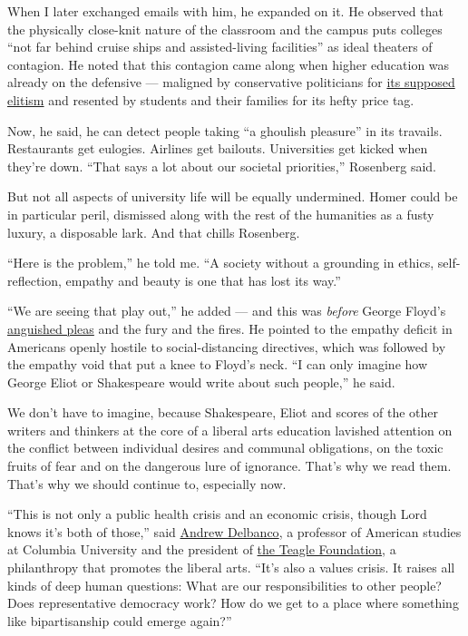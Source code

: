 When I later exchanged emails with him, he expanded on it. He observed
that the physically close-knit nature of the classroom and the campus
puts colleges ``not far behind cruise ships and assisted-living
facilities'' as ideal theaters of contagion. He noted that this
contagion came along when higher education was already on the defensive
--- maligned by conservative politicians for
\href{https://www.washingtonpost.com/sf/national/2017/11/25/elitists-crybabies-and-junky-degrees/?utm_term=.032f27b188bc}{its
supposed elitism} and resented by students and their families for its
hefty price tag.

Now, he said, he can detect people taking ``a ghoulish pleasure'' in its
travails. Restaurants get eulogies. Airlines get bailouts. Universities
get kicked when they're down. ``That says a lot about our societal
priorities,'' Rosenberg said.

But not all aspects of university life will be equally undermined. Homer
could be in particular peril, dismissed along with the rest of the
humanities as a fusty luxury, a disposable lark. And that chills
Rosenberg.

``Here is the problem,'' he told me. ``A society without a grounding in
ethics, self-reflection, empathy and beauty is one that has lost its
way.''

``We are seeing that play out,'' he added --- and this was \emph{before}
George Floyd's
\href{https://www.nytimes3xbfgragh.onion/2020/05/31/us/george-floyd-investigation.html}{anguished
pleas} and the fury and the fires. He pointed to the empathy deficit in
Americans openly hostile to social-distancing directives, which was
followed by the empathy void that put a knee to Floyd's neck. ``I can
only imagine how George Eliot or Shakespeare would write about such
people,'' he said.

We don't have to imagine, because Shakespeare, Eliot and scores of the
other writers and thinkers at the core of a liberal arts education
lavished attention on the conflict between individual desires and
communal obligations, on the toxic fruits of fear and on the dangerous
lure of ignorance. That's why we read them. That's why we should
continue to, especially now.

``This is not only a public health crisis and an economic crisis, though
Lord knows it's both of those,'' said
\href{https://english.columbia.edu/content/andrew-delbanco}{Andrew
Delbanco}, a professor of American studies at Columbia University and
the president of \href{http://www.teaglefoundation.org/Home}{the Teagle
Foundation}, a philanthropy that promotes the liberal arts. ``It's also
a values crisis. It raises all kinds of deep human questions: What are
our responsibilities to other people? Does representative democracy
work? How do we get to a place where something like bipartisanship could
emerge again?''

